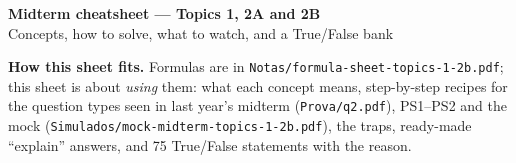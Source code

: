 \documentclass[10pt,a4paper]{article}
\begin{document}
\begin{center}
  {\LARGE\bfseries Midterm cheatsheet --- Topics 1, 2A and 2B}\\[3pt]
  {\large Concepts, how to solve, what to watch, and a True/False bank}
\end{center}
\vspace{-4pt}
\noindent\textbf{How this sheet fits.} Formulas are in \texttt{Notas/formula-sheet-topics-1-2b.pdf}; this
sheet is about \emph{using} them: what each concept means, step-by-step recipes for the question types
seen in last year's midterm (\texttt{Prova/q2.pdf}), PS1--PS2 and the mock
(\texttt{Simulados/mock-midterm-topics-1-2b.pdf}), the traps, ready-made ``explain'' answers, and 75
True/False statements with the reason.

\end{document}
